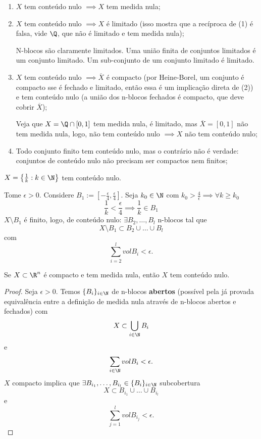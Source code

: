 \begin{observe}
    \begin{enumerate}
        \item $X$ tem conteúdo nulo $\implies X$ tem medida nula;
	\item $X$ tem conteúdo nulo $\implies X$ é limitado (isso mostra que a recíproca de (1) é falsa, vide $\Q$, que não é limitado e tem medida nula);

	    N-blocos são claramente limitados. Uma união finita de conjuntos limitados é um conjunto limitado. Um sub-conjunto de um conjunto limitado é limitado.

	\item $X$ tem conteúdo nulo $\implies \overline{X}$ é compacto (por Heine-Borel, um conjunto é compacto sse é fechado e limitado, então essa é um implicação direta de (2)) e tem conteúdo nulo (a união dos n-blocos fechados é compacto, que deve cobrir $\overline{X}$);

	    Veja que $X=\Q \cap \left[ 0,1 \right] $ tem medida nula, é limitado, mas $\overline{X} = \left[ 0,1 \right] $ não tem medida nula, logo, não tem conteúdo nulo $\implies X$ não tem conteúdo nulo;
	\item Todo conjunto finito tem conteúdo nulo, mas o contrário não é verdade: conjuntos de conteúdo nulo não precisam ser compactos nem finitos;
    \end{enumerate}
\end{observe}

\begin{eg}
    $X=\left\{ \frac{1}{k}:k\in \N \right\} $ tem conteúdo nulo.

    Tome $\epsilon > 0$. Considere $B_1:= \left[ -\frac{\epsilon}{4}, \frac{\epsilon}{4} \right] $. Seja $k_0 \in  \N$ com $k_0>\frac{4}{\epsilon} \implies \forall k\ge k_0$ \[
    \frac{1}{k} < \frac{\epsilon}{4} \implies \frac{1}{k} \in B_1
\] $X\setminus B_1$ é finito, logo, de conteúdo nulo: $\exists B_2,\ldots,B_l$ n-blocos tal que \[
X\setminus B_1 \subset  B_2 \cup \ldots\cup B_l
\] com \[
\sum_{i=2}^{l} vol B_i < \epsilon
.\]
\end{eg}

\begin{prop}
    Se $X\subset \R^{n}$ é compacto e tem medida nula, então $X$ tem conteúdo nulo.
\end{prop}

\begin{proof}
    Seja $\epsilon>0$. Temos $\{B_i\} _{i\in \N}$ de n-blocos \textbf{abertos} (possível pela já provada equivalência entre a definição de medida nula através de n-blocos abertos e fechados) com \[
    X \subset \bigcup_{i\in \N} B_i
    \] e \[
    \sum_{i\in \N} vol B_i < \epsilon
    .\] $X$ compacto implica que $\exists B_{i_1},\ldots,B_{i_l} \in \{B_i\} _{i\in \N}$ subcobertura \[
    X \subset B_{i_1} \cup \ldots\cup B_{i_l}
    \] e \[
    \sum_{j=1}^{l} vol B_{i_j} < \epsilon
    .\] 
\end{proof}

